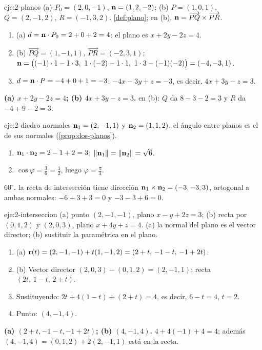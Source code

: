 \begin{solucion}{eje:2-planos}
\datos (a) $P_0=(2,0,-1)$, $\mathbf{n}=(1,2,-2)$; (b) $P=(1,0,1)$, $Q=(2,-1,2)$, $R=(-1,3,2)$.
\planteamiento \cref{def:plano}; en (b), $\mathbf{n}=\overrightarrow{PQ}\times\overrightarrow{PR}$.
\pasos
\begin{enumerate}[label=\arabic*.]
  \item (a) $d=\mathbf{n}\cdot P_0=2+0+2=4$: el plano es $x+2y-2z=4$.
  \item (b) $\overrightarrow{PQ}=(1,-1,1)$, $\overrightarrow{PR}=(-2,3,1)$; $\vn=\bigl((-1)\cdot1-1\cdot3,\ 1\cdot(-2)-1\cdot1,\ 1\cdot3-(-1)(-2)\bigr)=(-4,-3,1)$.
  \item $d=\mathbf{n}\cdot P=-4+0+1=-3$: $-4x-3y+z=-3$, es decir, $4x+3y-z=3$.
\end{enumerate}
\resultado \textbf{(a) $x+2y-2z=4$; (b) $4x+3y-z=3$.}
\comprobacion en (b): $Q$ da $8-3-2=3$ y $R$ da $-4+9-2=3$.
\end{solucion}

\begin{solucion}{eje:2-diedro}
\datos normales $\mathbf{n}_1=(2,-1,1)$ y $\mathbf{n}_2=(1,1,2)$.
\planteamiento el ángulo entre planos es el de sus normales (\cref{prop:dos-planos}).
\pasos
\begin{enumerate}[label=\arabic*.]
  \item $\mathbf{n}_1\cdot\mathbf{n}_2=2-1+2=3$; $\lVert\mathbf{n}_1\rVert=\lVert\mathbf{n}_2\rVert=\sqrt6$.
  \item $\cos\varphi=\frac36=\frac12$, luego $\varphi=\frac\pi3$.
\end{enumerate}
\resultado \textbf{$60^\circ$.}
\comprobacion la recta de intersección tiene dirección $\mathbf{n}_1\times\mathbf{n}_2=(-3,-3,3)$, ortogonal a ambas normales: $-6+3+3=0$ y $-3-3+6=0$.
\end{solucion}

\begin{solucion}{eje:2-interseccion}
\datos (a) punto $(2,-1,-1)$, plano $x-y+2z=3$; (b) recta por $(0,1,2)$ y $(2,0,3)$, plano $x+4y+z=4$.
\planteamiento (a) la normal del plano es el vector director; (b) sustituir la paramétrica en el plano.
\pasos
\begin{enumerate}[label=\arabic*.]
  \item (a) $\mathbf{r}(t)=(2,-1,-1)+t(1,-1,2)=(2+t,\,-1-t,\,-1+2t)$.
  \item (b) Vector director $(2,0,3)-(0,1,2)=(2,-1,1)$; recta $(2t,\,1-t,\,2+t)$.
  \item Sustituyendo: $2t+4(1-t)+(2+t)=4$, es decir, $6-t=4$, $t=2$.
  \item Punto: $(4,-1,4)$.
\end{enumerate}
\resultado \textbf{(a) $(2+t,-1-t,-1+2t)$; (b) $(4,-1,4)$.}
\comprobacion $4+4(-1)+4=4$; además $(4,-1,4)=(0,1,2)+2(2,-1,1)$ está en la recta.
\end{solucion}

